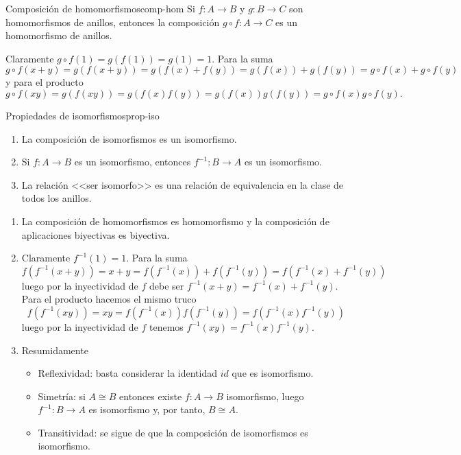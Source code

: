 \begin{proposition}{Composición de homomorfismos}{comp-hom}
    Si \(f: A \to B\) y \(g: B \to C\) son homomorfismos de anillos, entonces la composición \(g \circ f: A \to C\) es un homomorfismo de anillos.
\end{proposition}

\begin{proofbox}
    Claramente $g \circ f (1) = g(f(1)) = g(1) = 1$. Para la suma
    \[
    g \circ f (x + y) = g(f(x + y)) = g(f(x) + f(y)) = g(f(x)) + g(f(y)) = g \circ f (x) + g \circ f (y)
    \]
    y para el producto
    \[
    g \circ f (xy) = g(f(xy)) = g(f(x)f(y)) = g(f(x))g(f(y)) = g \circ f (x) g \circ f (y).
    \]
\end{proofbox}

\begin{proposition}{Propiedades de isomorfismos}{prop-iso}
    \begin{enumerate}
        \item La composición de isomorfismos es un isomorfismo.
        \item Si \(f: A \to B\) es un isomorfismo, entonces \(f^{-1}: B \to A\) es un isomorfismo.
        \item La relación <<ser isomorfo>> es una relación de equivalencia en la clase de todos los anillos.
    \end{enumerate}
\end{proposition}

\begin{proofbox}
    \begin{enumerate}
        \item La composición de homomorfismos es homomorfismo y la composición de aplicaciones biyectivas es biyectiva.

        \item Claramente $f^{-1}(1) = 1$. Para la suma
        \[
        f(f^{-1}(x + y)) = x + y = f(f^{-1}(x)) + f(f^{-1}(y)) = f(f^{-1}(x) + f^{-1}(y))
        \]
        luego por la inyectividad de $f$ debe ser $f^{-1}(x + y) = f^{-1}(x) + f^{-1}(y)$.
        Para el producto hacemos el mismo truco
        \[
        f(f^{-1}(xy)) = xy = f(f^{-1}(x))f(f^{-1}(y)) = f(f^{-1}(x)f^{-1}(y))
        \]
        luego por la inyectividad de $f$ tenemos $f^{-1}(xy) = f^{-1}(x) f^{-1}(y)$.
        \item Resumidamente
        \begin{itemize}
            \item Reflexividad: basta considerar la identidad $id$ que es isomorfismo.

            \item Simetría: si $A \cong B$ entonces existe $f: A \to B$ isomorfismo, luego $f^{-1} : B \to A$ es isomorfismo y, por tanto, $B \cong A$.

            \item Transitividad: se sigue de que la composición de isomorfismos es isomorfismo.
        \end{itemize}
    \end{enumerate}
\end{proofbox}

